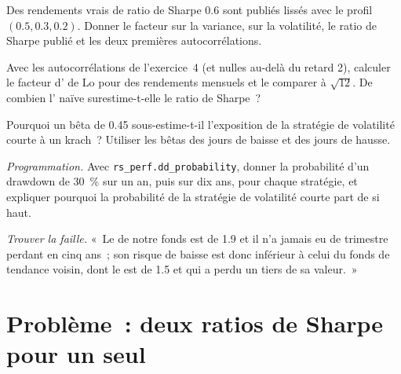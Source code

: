 \begin{exercise}[$\star\star$]\label{exo:rs:performance-measurement:4}
Des rendements vrais de ratio de Sharpe 0.6 sont publiés lissés avec le profil $(0.5, 0.3, 0.2)$. Donner le facteur sur la variance, sur la volatilité, le
ratio de Sharpe publié et les deux premières autocorrélations.
\end{exercise}

\begin{exercise}[$\star\star$]\label{exo:rs:performance-measurement:5}
Avec les autocorrélations de l'exercice~4 (et nulles au-delà du retard 2), calculer le facteur d' de Lo pour des rendements mensuels et le comparer à $\sqrt{12}$. De combien
l' naïve surestime-t-elle le ratio de Sharpe~?
\end{exercise}

\begin{exercise}[$\star\star$]\label{exo:rs:performance-measurement:6}
Pourquoi un bêta de 0.45 sous-estime-t-il l'exposition de la stratégie de volatilité courte à un krach~? Utiliser les bêtas des jours de baisse et des jours de hausse.
\end{exercise}

\begin{exercise}[$\star\star\star$]\label{exo:rs:performance-measurement:7}
\emph{Programmation.} Avec \texttt{rs\_perf.dd\_probability}, donner la probabilité d'un drawdown de 30~\% sur un an, puis sur dix ans, pour chaque stratégie, et expliquer pourquoi
la probabilité de la stratégie de volatilité courte part de si haut.
\end{exercise}

\begin{exercise}[$\star\star\star$]\label{exo:rs:performance-measurement:8}
\emph{Trouver la faille.} «~Le  de notre fonds est de 1.9 et il n'a jamais eu de trimestre perdant en cinq ans~; son risque de baisse est donc inférieur à celui du
fonds de tendance voisin, dont le  est de 1.5 et qui a perdu un tiers de sa valeur.~»
\end{exercise}

\section{Problème~: deux ratios de Sharpe pour un seul}

